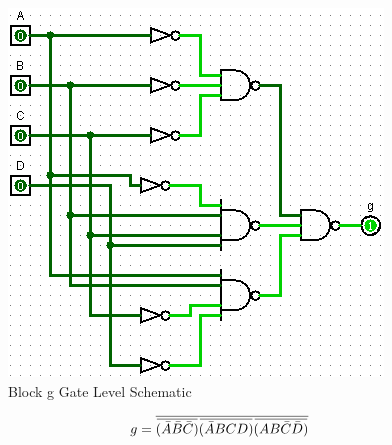 \documentclass[12pt]{article}
\newcommand{\overbar}[1]{\mkern 1.5mu\overline{\mkern-1.5mu#1\mkern-1.5mu}\mkern 1.5mu} %
\begin{document}
\begin{figure}[h]
	\centering
	\label{fig:gBlockGates}
	\includegraphics[width=0.65\linewidth, keepaspectratio]{g_logicCkt}
	\caption{Block g Gate Level Schematic}
\end{figure}

\begin{equation}
	g = \overline{\overbar{(\bar{A}\bar{B}\bar{C})}\overbar{(\bar{A}BCD)}\overbar{(AB\bar{C}\bar{D})}}
\end{equation}
\end{document}
